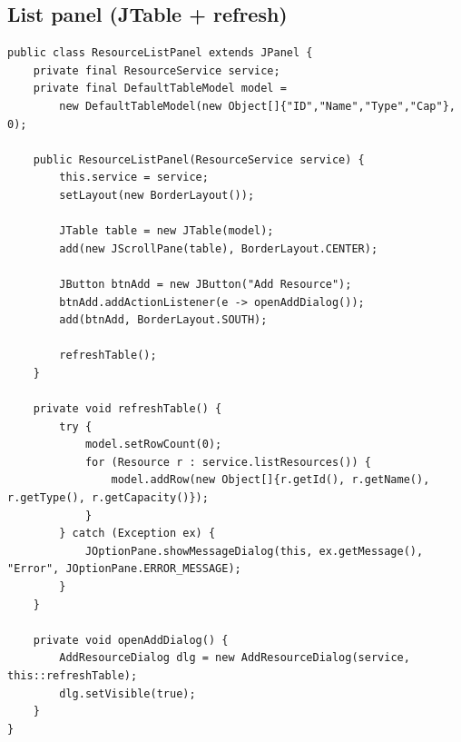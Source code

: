 \documentclass[11pt]{article}
\begin{document}
\subsection{List panel (JTable + refresh)}
\begin{lstlisting}
public class ResourceListPanel extends JPanel {
    private final ResourceService service;
    private final DefaultTableModel model =
        new DefaultTableModel(new Object[]{"ID","Name","Type","Cap"}, 0);

    public ResourceListPanel(ResourceService service) {
        this.service = service;
        setLayout(new BorderLayout());

        JTable table = new JTable(model);
        add(new JScrollPane(table), BorderLayout.CENTER);

        JButton btnAdd = new JButton("Add Resource");
        btnAdd.addActionListener(e -> openAddDialog());
        add(btnAdd, BorderLayout.SOUTH);

        refreshTable();
    }

    private void refreshTable() {
        try {
            model.setRowCount(0);
            for (Resource r : service.listResources()) {
                model.addRow(new Object[]{r.getId(), r.getName(), r.getType(), r.getCapacity()});
            }
        } catch (Exception ex) {
            JOptionPane.showMessageDialog(this, ex.getMessage(), "Error", JOptionPane.ERROR_MESSAGE);
        }
    }

    private void openAddDialog() {
        AddResourceDialog dlg = new AddResourceDialog(service, this::refreshTable);
        dlg.setVisible(true);
    }
}
\end{lstlisting}
\end{document}
